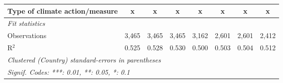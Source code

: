 \begin{table}[htbp]
\begin{tabular}{lccccccc}
      Type of climate action/measure                                 & x              & x              & x              & x             & x             & x             & x\\  
      \midrule \emph{Fit statistics}\\
      Observations                                                   & 3,465          & 3,465          & 3,465          & 3,162         & 2,601         & 2,601         & 2,412\\  
      R$^2$                                                          & 0.525          & 0.528          & 0.530          & 0.500         & 0.503         & 0.504         & 0.512\\  
      \midrule
      \multicolumn{8}{l}{\emph{Clustered (Country) standard-errors in parentheses}}\\
      \multicolumn{8}{l}{\emph{Signif. Codes: ***: 0.01, **: 0.05, *: 0.1}}\\
   \end{tabular}
\end{table}


